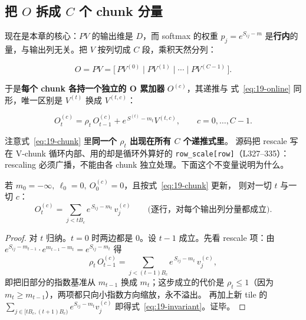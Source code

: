 \subsection{把 $O$ 拆成 $C$ 个 chunk 分量}

现在是本章的核心：$PV$ 的输出维是 $D$，而 softmax 的权重 $p_j = e^{S_{ij}-m}$
是\textbf{行内}的量，与输出列无关。把 $V$ 按列切成 $C$ 段，乘积天然分列：

\begin{equation}
  O = P V = \bigl[\, P V^{(0)} \mid P V^{(1)} \mid \cdots \mid P V^{(C-1)} \,\bigr] .
  \label{eq:19-direct-sum}
\end{equation}

于是\textbf{每个 chunk 各持一个独立的 O 累加器} $O^{(c)}$，其递推与
式~\ref{eq:19-online} 同形，唯一区别是 $V^{(t)}$ 换成 $V^{(t,c)}$：

\begin{equation}
  O^{(c)}_t = \rho_t\, O^{(c)}_{t-1} + e^{\,S^{(t)} - m_t} V^{(t,c)} ,
  \qquad c = 0,\dots,C-1 .
  \label{eq:19-chunk}
\end{equation}

注意式~\ref{eq:19-chunk} 里\textbf{同一个 $\rho_t$ 出现在所有 $C$ 个递推式里}。
源码把 rescale 写在 V-chunk 循环内部、用的却是循环外算好的
\texttt{row\_\allowbreak{}scale[row]}（L327--335）：rescaling 必须广播，不能由各 chunk
独立处理。下面这个不变量说明为什么。

\begin{theorem}
  若 $m_0 = -\infty,\ \ell_0 = 0,\ O^{(c)}_0 = 0$，且按式~\ref{eq:19-chunk} 更新，
  则对一切 $t$ 与一切 $c$：
  \begin{equation}
    O^{(c)}_t = \sum_{j < t B_c} e^{\,S_{ij} - m_t}\, v^{(c)}_j
    \qquad\text{(逐行，对每个输出列分量都成立)} .
    \label{eq:19-invariant}
  \end{equation}
\end{theorem}

\begin{proof}
  对 $t$ 归纳。$t=0$ 时两边都是 0。设 $t-1$ 成立。先看 rescale 项：由
  $e^{S_{ij}-m_{t-1}} \cdot e^{m_{t-1}-m_t} = e^{S_{ij}-m_t}$ 得
  \begin{equation*}
    \rho_t\, O^{(c)}_{t-1}
      = \sum_{j < (t-1)B_c} e^{\,S_{ij} - m_t}\, v^{(c)}_j ,
  \end{equation*}
  即把旧部分的指数基准从 $m_{t-1}$ 换成 $m_t$；这步成立的代价是
  $\rho_t \le 1$（因为 $m_t \ge m_{t-1}$），两项都只向小指数方向缩放，永不溢出。
  再加上新 tile 的 $\sum_{j \in [tB_c, (t+1)B_c)} e^{S_{ij}-m_t} v^{(c)}_j$
  即得式~\ref{eq:19-invariant}。证毕。
\end{proof}

